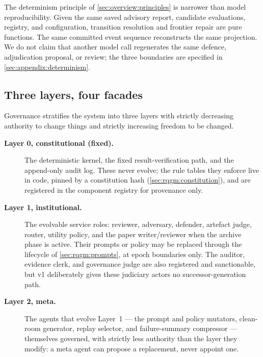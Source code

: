 The determinism principle of \cref{sec:overview:principles} is narrower
than model reproducibility. Given the same saved advisory report,
candidate evaluations, registry, and configuration, transition resolution
and frontier repair are pure functions. The same committed event sequence
reconstructs the same projection. We do not claim that another model call
regenerates the same defence, adjudication proposal, or review; the three
boundaries are specified in \cref{sec:appendix:determinism}.

\subsection{Three layers, four facades}\label{sec:rqgm:layers}

Governance stratifies the system into three layers with strictly
decreasing authority to change things and strictly increasing freedom
to be changed.

\begin{description}
  \item[\textbf{Layer 0, constitutional (fixed).}] The deterministic
        kernel, the fixed result-verification path, and the
        append-only audit log. These never evolve; the rule tables
        they enforce live in code, pinned by a constitution hash
        (\cref{sec:rqgm:constitution}), and are registered in the
        component registry for provenance only.
  \item[\textbf{Layer 1, institutional.}] The evolvable service
        roles: reviewer, adversary, defender, artefact judge, router,
        utility policy, and the paper writer/reviewer when the archive
        phase is active. Their prompts or policy may be replaced through
        the lifecycle of \cref{sec:rqgm:prompts}, at epoch boundaries
        only. The auditor, evidence clerk, and governance judge are also
        registered and sanctionable, but v1 deliberately gives these
        judiciary actors no successor-generation path.
  \item[\textbf{Layer 2, meta.}] The agents that evolve Layer~1 ---
        the prompt and policy mutators, clean-room generator, replay
        selector, and failure-summary compressor --- themselves governed, with strictly
        less authority than the layer they modify: a meta agent can
        propose a replacement, never appoint one.
\end{description}

